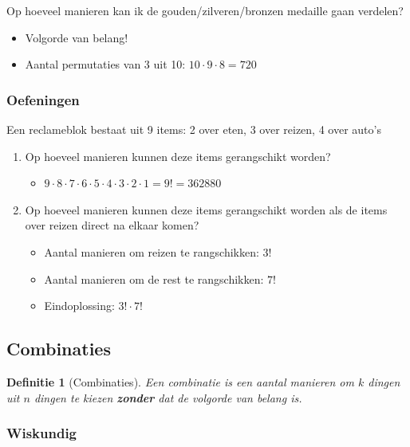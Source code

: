 \documentclass{article}
\newtheorem{theorem}{Definitie}[section]
\begin{document}
Op hoeveel manieren kan ik de gouden/zilveren/bronzen medaille gaan verdelen?

\begin{itemize}
    \item Volgorde van belang!
    \item Aantal permutaties van 3 uit 10: $10 \cdot 9 \cdot 8 = 720$
\end{itemize}

\subsubsection{Oefeningen}

Een reclameblok bestaat uit 9 items: 2 over eten, 3 over reizen, 4 over auto's

\begin{enumerate}
    \item Op hoeveel manieren kunnen deze items gerangschikt worden?
    \begin{itemize}
        \item $9 \cdot 8 \cdot 7 \cdot 6 \cdot 5 \cdot 4 \cdot 3 \cdot 2 \cdot 1 = 9! = 362880$
    \end{itemize}
    \item Op hoeveel manieren kunnen deze items gerangschikt worden als de items over reizen direct na elkaar komen?
    \begin{itemize}
        \item Aantal manieren om reizen te rangschikken: $3!$
        \item Aantal manieren om de rest te rangschikken: $7!$
        \item Eindoplossing: $3! \cdot 7!$
    \end{itemize}
\end{enumerate}

\subsection{Combinaties}

\begin{theorem}[Combinaties]
    Een combinatie is een aantal manieren om $k$ dingen uit $n$ dingen te kiezen \textbf{zonder} dat de volgorde van belang is.
\end{theorem}

\subsubsection{Wiskundig}
\end{document}

